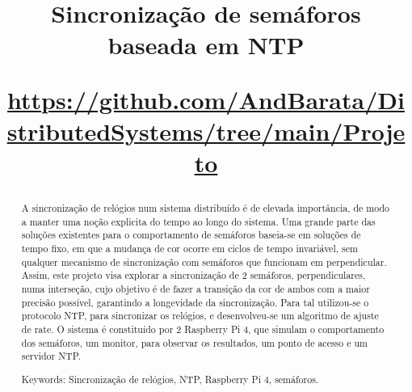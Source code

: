 \documentclass[conference]{IEEEtran}
\begin{document}
\title{Sincronização de semáforos baseada em NTP   

    \vspace{0.2cm}   
    \small \url{https://github.com/AndBarata/DistributedSystems/tree/main/Projeto}
}

\author{
\and
}



\maketitle



\begin{abstract}

A sincronização de relógios num sistema distribuído
é de elevada importância, de modo a manter uma noção explicita
do tempo ao longo do sistema. Uma grande parte 
das soluções existentes para o comportamento de semáforos
baseia-se em soluções de tempo fixo, em que
a mudança de cor ocorre em ciclos de tempo invariável, sem qualquer
mecanismo de sincronização com semáforos que funcionam em 
perpendicular. Assim, este projeto visa explorar a sincronização de 2 semáforos, perpendiculares, numa interseção, cujo objetivo é de fazer a transição da cor de ambos com a maior precisão possível, garantindo a longevidade da sincronização. Para tal utilizou-se o protocolo NTP, para sincronizar os relógios, e desenvolveu-se um algoritmo de ajuste de rate. O sistema é constituído por 2 Raspberry Pi 4, que simulam o comportamento dos semáforos, um monitor, para observar os resultados, um ponto de acesso e um servidor NTP.

Keywords: Sincronização de relógios, NTP, Raspberry Pi 4, semáforos.

\end{abstract}














\renewcommand{\refname}{Referências} %
\end{document}
